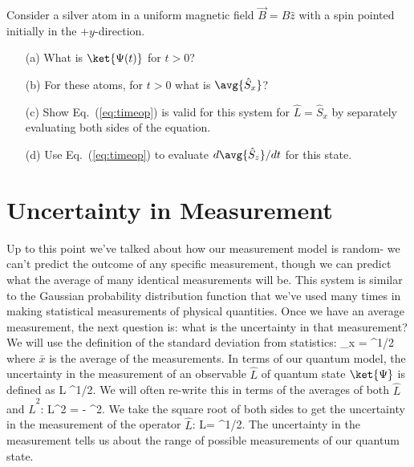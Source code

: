 \begin{exercise}
\label{ex:timeex}
Consider a silver atom in a uniform magnetic field $\vec{B}= B\hat{z}$ with a spin pointed initially in the $+y$-direction.
\begin{enumerate}
\item[(a)] What is $\ket{\Psi(t)}$ for $t > 0$?
\item[(b)] For these atoms, for $t > 0$ what is $\avg{\hat{S}_x}$?
\item[(c)] Show Eq.~(\ref{eq:timeop}) is valid for this system for $\hat{L}=\hat{S}_x$ by separately evaluating both sides of the equation.
\item[(d)] Use Eq.~(\ref{eq:timeop}) to evaluate $d\avg{\hat{S}_z}/dt$ for this state.
\end{enumerate}
\end{exercise}

\section{Uncertainty in Measurement}
Up to this point we've talked about how our measurement model is random- we can't predict the outcome of any specific measurement, though we can predict what the average of many identical measurements will be. This system is similar to the Gaussian probability distribution function that we've used many times in making statistical measurements of physical quantities. Once we have an average measurement, the next question is: what is the uncertainty in that measurement? We will use the definition of the standard deviation from statistics:
\beq
\sigma_x = \left[\sum_{i=1}^{N}(x_i - \bar{x})^2\right]^{1/2}
\eeq
where $\bar{x}$ is the average of the measurements. In terms of our quantum model, the uncertainty in the measurement of an observable $\hat{L}$ of quantum state $\ket{\Psi}$ is defined as
\beq
\Delta L \equiv {}^{1/2}.
\label{eq:uncert}
\eeq
We will often re-write this in terms of the averages of both $\hat{L}$ and $\hat{L}^2$:
\beq
\Delta L^2 =  - ^2.
\eeq
We take the square root of both sides to get the uncertainty in the measurement of the operator $\hat{L}$:
\beq
\Delta L= ^{1/2}.
\label{eq:meunc}
\eeq
The uncertainty in the measurement tells us about the range of possible measurements of our quantum state. 

